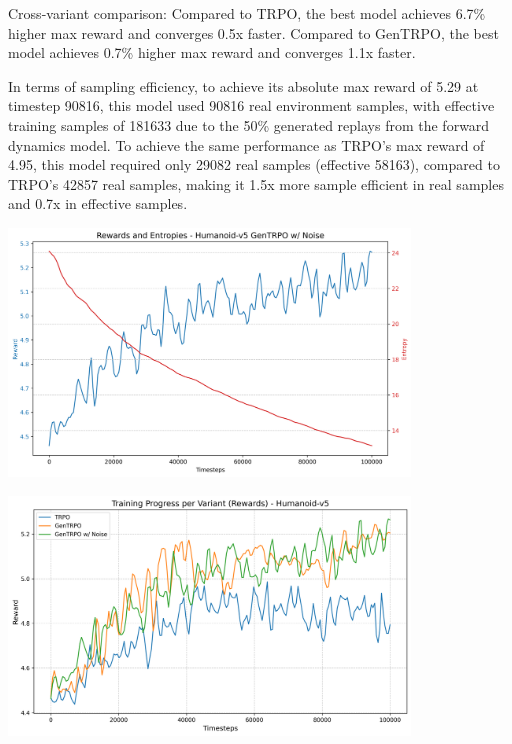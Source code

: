 \documentclass{svproc}
\begin{document}
Cross-variant comparison: Compared to TRPO, the best model achieves 6.7\% higher max reward and converges 0.5x faster. Compared to GenTRPO, the best model achieves 0.7\% higher max reward and converges 1.1x faster. 

In terms of sampling efficiency, to achieve its absolute max reward of 5.29 at timestep 90816, this model used 90816 real environment samples, with effective training samples of 181633 due to the 50\% generated replays from the forward dynamics model. To achieve the same performance as TRPO's max reward of 4.95, this model required only 29082 real samples (effective 58163), compared to TRPO's 42857 real samples, making it 1.5x more sample efficient in real samples and 0.7x in effective samples.

\begin{center}
\includegraphics[width=0.8\textwidth]{graph_Humanoid-v5_gentrpo-ne_rewards_entropies.png}
\end{center}

\begin{center}
\includegraphics[width=0.8\textwidth]{graph_rewards_Humanoid-v5.png}
\end{center}
\end{document}
